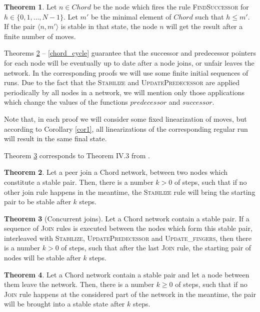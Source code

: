 \documentclass{amsart}
\theoremstyle{definition}
\newtheorem{theorem}{Theorem}[section]
\begin{document}
\begin{theorem}\label{succend}
Let $n \in Chord$ be the node which fires the rule
\textsc{FindSuccessor} for $h \in \{0, 1, \ldots , N-1\}$. Let
$m'$ be the minimal element of $Chord$ such that $h \leqslant m'$.
If the pair $\langle n, m' \rangle$ is stable in that state, the
node $n$ will get the result after a finite number of moves.

\end{theorem}


Theorems \ref{stabthj} -- \ref{chord_cycle} guarantee that the successor and predecessor pointers for each node will be eventually
up to date after a node joins, or unfair leaves the network. In the corresponding proofs we will use some finite initial sequences of
runs. Due to the fact that the \textsc{Stabilize} and \textsc{UpdatePredecessor} are applied periodically by all nodes in a network, we will
mention only those applications which change the values of the functions $predecessor$ and $successor$.

Note that, in each proof we will consider some fixed linearization
of moves, but according to Corollary \ref{cor1}, all
linearizations of the corresponding regular run will result in the
same final state.

Theorem \ref{concjoin} corresponds to Theorem IV.3 from \cite{Chord,Chord-TR,Chord-IEEE}.

\begin{theorem}\label{stabthj}
Let a peer join a Chord network, between two nodes which constitute a stable pair. Then, there is a number $k>0$ of steps, such that if no other join rule
happens in the meantime, the \textsc{Stabilize} rule will bring the starting pair to be stable after $k$ steps.

\end{theorem}

\begin{theorem}[Concurrent joins]\label{concjoin}
Let a Chord network contain a stable pair. If a sequence of \textsc{Join} rules is executed between the nodes which form this stable pair, interleaved with \textsc{Stabilize}, \textsc{UpdatePredecessor}
and \textsc{Update\_fingers}, then there is a number $k > 0$ of steps, such that after the last \textsc{Join} rule, the starting pair of nodes will be
stable after $k$ steps.

\end{theorem}


\begin{theorem}\label{stabthl}
Let a Chord network contain a stable pair and let a node between them leave the network.
Then, there is a number $k \geqslant 0$ of steps, such that if no
\textsc{Join} rule happens at the considered part of the network
in the meantime,
the pair will be brought into a stable state after $k$ steps.
\end{theorem}
\end{document}
